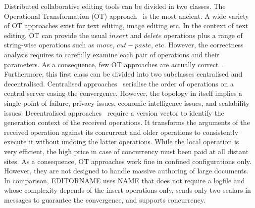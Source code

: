 Distributed collaborative editing tools can be divided in two classes. The
Operational Transformation (OT) approach~\cite{saito2005optimistic} is the most
ancient. A wide variety of OT approaches exist for text editing, image editing
etc. In the context of text editing, OT can provide the usual $insert$ and
$delete$ operations plus a range of string-wise operations such as $move$,
$cut-paste$, etc. However, the correctness analysis requires to carefully
examine each pair of operations and their parameters. As a consequence, few OT
approaches are actually correct~\cite{imine2003proving}. Furthermore, this
first class can be divided into two subclasses centralised and
decentralised. Centralised approaches~\cite{nichols1995high} serialise the
order of operations on a central server easing the convergence. However, the
topology in itself implies a single point of failure, privacy issues, economic
intelligence issues, and scalability issues. Decentralised
approaches~\cite{sun2009contextbased} require a version vector to identify the
generation context of the received operations. It transforms the arguments of
the received operation against its concurrent and older operations to
consistently execute it without undoing the latter operations. While the local
operation is very efficient, the high price in case of concurrency must been
paid at all distant sites.  As a consequence, OT approaches work fine in
confined configurations only. However, they are not designed to handle massive
authoring of large documents. In comparison, EDITORNAME uses NAME that
does not require a logfile and whose complexity depends of the insert
operations only, sends only two scalars in messages to guarantee the
convergence, and supports concurrency.

